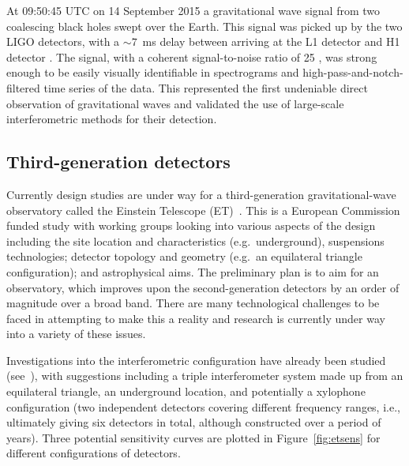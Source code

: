 At 09:50:45 UTC on 14 September 2015 a gravitational wave signal from two coalescing black holes swept 
over the Earth. This signal was picked up by the two LIGO detectors, with a $\sim 7$~ms delay between 
arriving at the L1 detector and H1 detector \cite{GW150914}. The signal, with a coherent signal-to-noise 
ratio of 25 \cite{2016PhRvL.116x1102A}, was strong enough to be easily visually identifiable in spectrograms 
and high-pass-and-notch-filtered time series of the data. This represented the first undeniable direct observation of 
gravitational waves and validated the use of large-scale interferometric methods for their detection.

\subsection{Third-generation detectors}
\label{subsec:et} 

Currently design studies are under way for a third-generation gravitational-wave
observatory called the Einstein Telescope (ET)~\cite{ETweb}. This is a European
Commission funded study with working groups looking into various aspects of the
design including the site location and characteristics (e.g.\, underground),
suspensions technologies; detector topology and geometry (e.g.\, an equilateral
triangle configuration); and astrophysical aims. The preliminary plan is to
aim for an observatory, which improves upon the second-generation detectors by
an order of magnitude over a broad band. There are many technological challenges
to be faced in attempting to make this a reality and research is currently under
way into a variety of these issues.


Investigations into the interferometric configuration have already been studied
(see~\cite{Freise:2008, Hild:2008, Hild:2010}), with suggestions including a
triple interferometer system made up from an equilateral triangle, an
underground location, and potentially a xylophone configuration (two independent
detectors covering different frequency ranges, i.e., ultimately giving six
detectors in total, although constructed over a period of years). Three
potential sensitivity curves are plotted in Figure~\ref{fig:etsens} for different
configurations of detectors.
